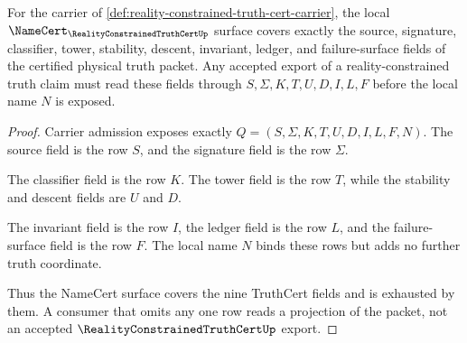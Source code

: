 \begin{theorem}
\label{thm:reality-constrained-truth-cert-field-coverage}
For the carrier of \autoref{def:reality-constrained-truth-cert-carrier}, the local $\NameCert_{\RealityConstrainedTruthCertUp}$ surface covers exactly the source, signature, classifier, tower, stability, descent, invariant, ledger, and failure-surface fields of the certified physical truth packet. Any accepted export of a reality-constrained truth claim must read these fields through $S,\Sigma,K,T,U,D,I,L,F$ before the local name $N$ is exposed.
\end{theorem}
\begin{proof}
Carrier admission exposes exactly $Q=(S,\Sigma,K,T,U,D,I,L,F,N)$. The source field is the row $S$, and the signature field is the row $\Sigma$.

The classifier field is the row $K$. The tower field is the row $T$, while the stability and descent fields are $U$ and $D$.

The invariant field is the row $I$, the ledger field is the row $L$, and the failure-surface field is the row $F$. The local name $N$ binds these rows but adds no further truth coordinate.

Thus the NameCert surface covers the nine TruthCert fields and is exhausted by them. A consumer that omits any one row reads a projection of the packet, not an accepted $\RealityConstrainedTruthCertUp$ export.
\end{proof}


